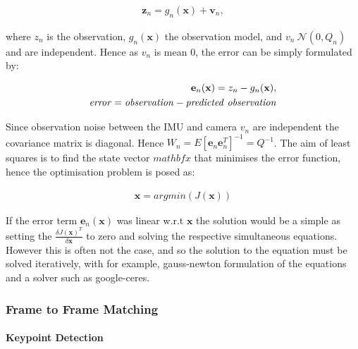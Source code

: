 \documentclass[a4paper,11pt,notitlepage]{article}
\begin{document}
\begin{equation}
\begin{aligned}
\textbf{z}_{n} = g_{n}(\textbf{x}) + \textbf{v}_{n},
\end{aligned}
\end{equation} 

where $z_{n}$ is the observation, $g_{n}(\textbf{x})$ the observation model, and $v_{n} ~ \mathcal{N}(0,Q_{n})$ and are independent. Hence as $v_{n}$ is mean 0, the error can be simply formulated by:

\begin{equation}
\begin{aligned}
\textbf{e}_{n}(\textbf{x}) = z_{n} - g_{n}(\textbf{x}), \\
\mathit{error = observation - predicted \textnormal{ } observation}
\end{aligned}
\end{equation}

Since observation noise between the IMU and camera $v_{n}$ are independent the covariance matrix is diagonal. Hence $W_{n} = E[\mathbf{e}_{n} \mathbf{e}_{n}^{T}]^{-1} = Q^{-1}$. The aim of least squares is to find the state vector $mathbf{x}$ that minimises the error function, hence the optimisation problem is posed as:

\begin{equation}
\begin{aligned}
\textbf{x} = argmin(J(\mathbf{x}))
\end{aligned}
\end{equation}

If the error term $\mathbf{e}_{n}(\mathbf{x})$ was linear w.r.t $\mathbf{x}$ the solution would be a simple as setting the $\frac{\delta J(\mathbf{x})^{T}}{\delta \mathbf{x}}$ to zero and solving the respective simultaneous equations. However this is often not the case, and so the solution to the equation must be solved iteratively, with for example, gauss-newton formulation of the equations and a solver such as google-ceres.

\subsubsection{Frame to Frame Matching}\label{BRISK_section}

\paragraph{Keypoint Detection}
\end{document}
